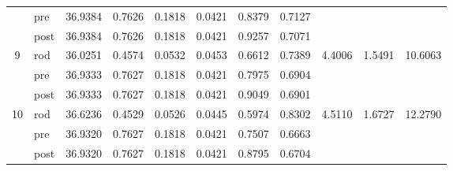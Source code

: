 \begin{table}[H]
\begin{tabular}{c l c c c c c c c c c}
                            & pre  & 36.9384 & 0.7626 & 0.1818 & 0.0421 & 0.8379 & 0.7127 &        &        &        \\
                            & post & 36.9384 & 0.7626 & 0.1818 & 0.0421 & 0.9257 & 0.7071 &        &        &        \\
        \midrule
        \multirow{3}{*}{9}  & rod  & 36.0251 & 0.4574 & 0.0532 & 0.0453 & 0.6612 & 0.7389 & 4.4006 & 1.5491 & 10.6063 \\
                            & pre  & 36.9333 & 0.7627 & 0.1818 & 0.0421 & 0.7975 & 0.6904 &        &        &        \\
                            & post & 36.9333 & 0.7627 & 0.1818 & 0.0421 & 0.9049 & 0.6901 &        &        &        \\
        \midrule
        \multirow{3}{*}{10} & rod  & 36.6236 & 0.4529 & 0.0526 & 0.0445 & 0.5974 & 0.8302 & 4.5110 & 1.6727 & 12.2790 \\
                            & pre  & 36.9320 & 0.7627 & 0.1818 & 0.0421 & 0.7507 & 0.6663 &        &        &        \\
                            & post & 36.9320 & 0.7627 & 0.1818 & 0.0421 & 0.8795 & 0.6704 &        &        &        \\
        \bottomrule
    \end{tabular}
\end{table}
